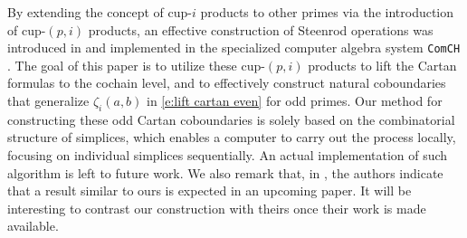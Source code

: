By extending the concept of cup-$i$ products to other primes via the introduction of cup-$(p,i)$ products, an effective construction of Steenrod operations was introduced in \cite{medina2021may_st} and implemented in the specialized computer algebra system \texttt{ComCH} \cite{medina2021comch}.
The goal of this paper is to utilize these cup-$(p,i)$ products to lift the Cartan formulas to the cochain level, and to effectively construct natural coboundaries that generalize $\zeta_i(a,b)$ in \cref{e:lift cartan even} for odd primes.
Our method for constructing these odd Cartan coboundaries is solely based on the combinatorial structure of simplices, which enables a computer to carry out the process locally, focusing on individual simplices sequentially.
An actual implementation of such algorithm is left to future work.
We also remark that, in \cite{brumfiel2023explicit}, the authors indicate that a result similar to ours is expected in an upcoming paper.
It will be interesting to contrast our construction with theirs once their work is made available.